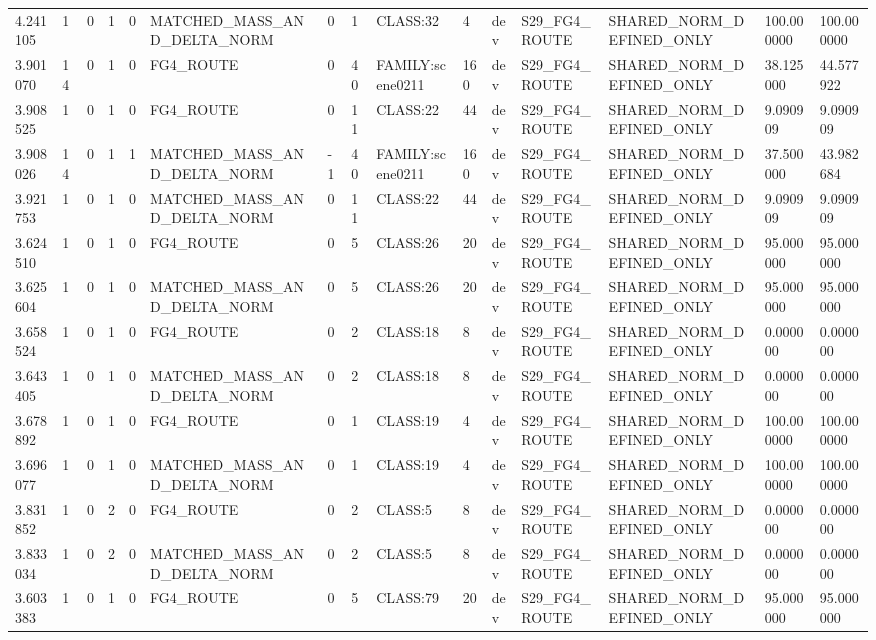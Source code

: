 \begin{tabular}{lllllllllllllll}
4.241105 & 1 & 0 & 1 & 0 & MATCHED\_MASS\_AND\_DELTA\_NORM & 0 & 1 & CLASS:32 & 4 & dev & S29\_FG4\_ROUTE & SHARED\_NORM\_DEFINED\_ONLY & 100.000000 & 100.000000 \\
3.901070 & 14 & 0 & 1 & 0 & FG4\_ROUTE & 0 & 40 & FAMILY:scene0211 & 160 & dev & S29\_FG4\_ROUTE & SHARED\_NORM\_DEFINED\_ONLY & 38.125000 & 44.577922 \\
3.908525 & 1 & 0 & 1 & 0 & FG4\_ROUTE & 0 & 11 & CLASS:22 & 44 & dev & S29\_FG4\_ROUTE & SHARED\_NORM\_DEFINED\_ONLY & 9.090909 & 9.090909 \\
3.908026 & 14 & 0 & 1 & 1 & MATCHED\_MASS\_AND\_DELTA\_NORM & -1 & 40 & FAMILY:scene0211 & 160 & dev & S29\_FG4\_ROUTE & SHARED\_NORM\_DEFINED\_ONLY & 37.500000 & 43.982684 \\
3.921753 & 1 & 0 & 1 & 0 & MATCHED\_MASS\_AND\_DELTA\_NORM & 0 & 11 & CLASS:22 & 44 & dev & S29\_FG4\_ROUTE & SHARED\_NORM\_DEFINED\_ONLY & 9.090909 & 9.090909 \\
3.624510 & 1 & 0 & 1 & 0 & FG4\_ROUTE & 0 & 5 & CLASS:26 & 20 & dev & S29\_FG4\_ROUTE & SHARED\_NORM\_DEFINED\_ONLY & 95.000000 & 95.000000 \\
3.625604 & 1 & 0 & 1 & 0 & MATCHED\_MASS\_AND\_DELTA\_NORM & 0 & 5 & CLASS:26 & 20 & dev & S29\_FG4\_ROUTE & SHARED\_NORM\_DEFINED\_ONLY & 95.000000 & 95.000000 \\
3.658524 & 1 & 0 & 1 & 0 & FG4\_ROUTE & 0 & 2 & CLASS:18 & 8 & dev & S29\_FG4\_ROUTE & SHARED\_NORM\_DEFINED\_ONLY & 0.000000 & 0.000000 \\
3.643405 & 1 & 0 & 1 & 0 & MATCHED\_MASS\_AND\_DELTA\_NORM & 0 & 2 & CLASS:18 & 8 & dev & S29\_FG4\_ROUTE & SHARED\_NORM\_DEFINED\_ONLY & 0.000000 & 0.000000 \\
3.678892 & 1 & 0 & 1 & 0 & FG4\_ROUTE & 0 & 1 & CLASS:19 & 4 & dev & S29\_FG4\_ROUTE & SHARED\_NORM\_DEFINED\_ONLY & 100.000000 & 100.000000 \\
3.696077 & 1 & 0 & 1 & 0 & MATCHED\_MASS\_AND\_DELTA\_NORM & 0 & 1 & CLASS:19 & 4 & dev & S29\_FG4\_ROUTE & SHARED\_NORM\_DEFINED\_ONLY & 100.000000 & 100.000000 \\
3.831852 & 1 & 0 & 2 & 0 & FG4\_ROUTE & 0 & 2 & CLASS:5 & 8 & dev & S29\_FG4\_ROUTE & SHARED\_NORM\_DEFINED\_ONLY & 0.000000 & 0.000000 \\
3.833034 & 1 & 0 & 2 & 0 & MATCHED\_MASS\_AND\_DELTA\_NORM & 0 & 2 & CLASS:5 & 8 & dev & S29\_FG4\_ROUTE & SHARED\_NORM\_DEFINED\_ONLY & 0.000000 & 0.000000 \\
3.603383 & 1 & 0 & 1 & 0 & FG4\_ROUTE & 0 & 5 & CLASS:79 & 20 & dev & S29\_FG4\_ROUTE & SHARED\_NORM\_DEFINED\_ONLY & 95.000000 & 95.000000 \\

\end{tabular}
